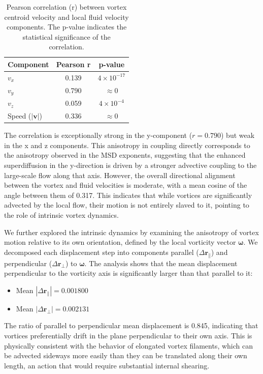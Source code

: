 \documentclass[]{article}
\begin{document}
\begin{table}[h!]
\centering
\caption{Pearson correlation (r) between vortex centroid velocity and local fluid velocity components. The p-value indicates the statistical significance of the correlation.}
\label{tab:vel_corr}
\begin{tabular}{lcc}
\hline
\hline
Component & Pearson r & p-value \\
\hline
$v_x$ & 0.139 & $4 \times 10^{-17}$ \\
$v_y$ & 0.790 & $\approx 0$ \\
$v_z$ & 0.059 & $4 \times 10^{-4}$ \\
Speed ($|\mathbf{v}|$) & 0.336 & $\approx 0$ \\
\hline
\end{tabular}
\end{table}

The correlation is exceptionally strong in the y-component ($r=0.790$) but weak in the x and z components. This anisotropy in coupling directly corresponds to the anisotropy observed in the MSD exponents, suggesting that the enhanced superdiffusion in the y-direction is driven by a stronger advective coupling to the large-scale flow along that axis. However, the overall directional alignment between the vortex and fluid velocities is moderate, with a mean cosine of the angle between them of 0.317. This indicates that while vortices are significantly advected by the local flow, their motion is not entirely slaved to it, pointing to the role of intrinsic vortex dynamics.

We further explored the intrinsic dynamics by examining the anisotropy of vortex motion relative to its own orientation, defined by the local vorticity vector $\boldsymbol{\omega}$. We decomposed each displacement step into components parallel ($\Delta\mathbf{r}_\parallel$) and perpendicular ($\Delta\mathbf{r}_\perp$) to $\boldsymbol{\omega}$. The analysis shows that the mean displacement perpendicular to the vorticity axis is significantly larger than that parallel to it:
\begin{itemize}
    \item Mean $|\Delta\mathbf{r}_\parallel| = 0.001800$
    \item Mean $|\Delta\mathbf{r}_\perp| = 0.002131$
\end{itemize}
The ratio of parallel to perpendicular mean displacement is 0.845, indicating that vortices preferentially drift in the plane perpendicular to their own axis. This is physically consistent with the behavior of elongated vortex filaments, which can be advected sideways more easily than they can be translated along their own length, an action that would require substantial internal shearing.
\end{document}
